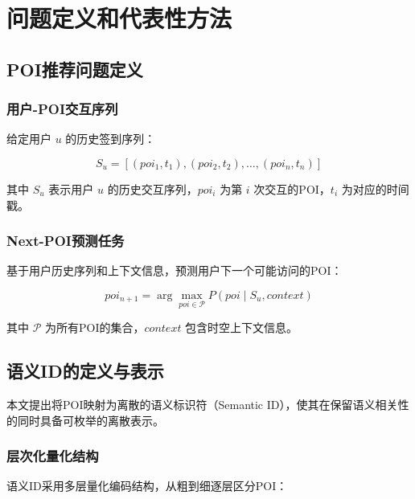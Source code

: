 \chapter{问题定义和代表性方法}
\label{chap:problem}

\section{POI推荐问题定义}
\label{sec:poi_problem}

\subsection{用户-POI交互序列}
\label{sec:user_poi_sequence}

给定用户 $u$ 的历史签到序列：

\begin{equation}
S_u = [(poi_1, t_1), (poi_2, t_2), \dots, (poi_n, t_n)]
\label{eq:user_sequence}
\end{equation}

其中 $S_u$ 表示用户 $u$ 的历史交互序列，$poi_i$ 为第 $i$ 次交互的POI，$t_i$ 为对应的时间戳。

\subsection{Next-POI预测任务}
\label{sec:next_poi_task}

基于用户历史序列和上下文信息，预测用户下一个可能访问的POI：

\begin{equation}
poi_{n+1} = \arg\max_{poi \in \mathcal{P}} P(poi \mid S_u, context)
\label{eq:next_poi}
\end{equation}

其中 $\mathcal{P}$ 为所有POI的集合，$context$ 包含时空上下文信息。

\section{语义ID的定义与表示}
\label{sec:sid_definition}

本文提出将POI映射为离散的语义标识符（Semantic ID），使其在保留语义相关性的同时具备可枚举的离散表示。

\subsection{层次化量化结构}
\label{sec:hierarchical_quant}

语义ID采用多层量化编码结构，从粗到细逐层区分POI：

